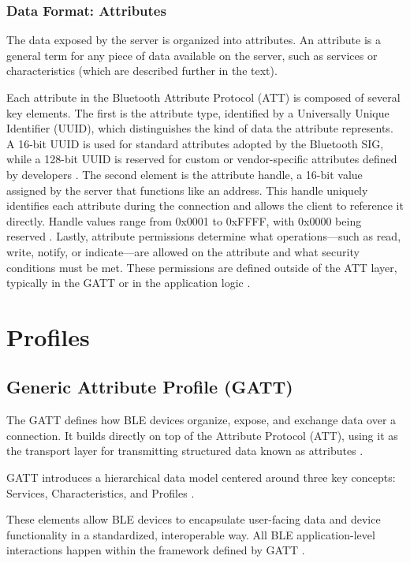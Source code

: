 \subsubsection{Data Format: Attributes}

The data exposed by the server is organized into attributes. An attribute is a general term for any piece of data available on the server, such as services or characteristics (which are described further in the text).

Each attribute in the Bluetooth Attribute Protocol (ATT) is composed of several key elements. The first is the attribute type, identified by a Universally Unique Identifier (UUID), which distinguishes the kind of data the attribute represents. A 16-bit UUID is used for standard attributes adopted by the Bluetooth SIG, while a 128-bit UUID is reserved for custom or vendor-specific attributes defined by developers \cite{introtoble}. The second element is the attribute handle, a 16-bit value assigned by the server that functions like an address. This handle uniquely identifies each attribute during the connection and allows the client to reference it directly. Handle values range from 0x0001 to 0xFFFF, with 0x0000 being reserved \cite{introtoble}. Lastly, attribute permissions determine what operations—such as read, write, notify, or indicate—are allowed on the attribute and what security conditions must be met. These permissions are defined outside of the ATT layer, typically in the GATT or in the application logic \cite{introtoble}.
\section{Profiles}

\subsection{Generic Attribute Profile (GATT)}

The GATT defines how BLE devices organize, expose, and exchange data over a connection. It builds directly on top of the Attribute Protocol (ATT), using it as the transport layer for transmitting structured data known as attributes \cite{introtoble}.

GATT introduces a hierarchical data model centered around three key concepts: Services, Characteristics, and Profiles \cite{introtoble}.

These elements allow BLE devices to encapsulate user-facing data and device functionality in a standardized, interoperable way. All BLE application-level interactions happen within the framework defined by GATT \cite{gettingstartedwble}.

